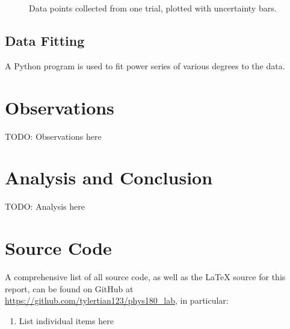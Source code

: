 \documentclass[aps,twocolumn,secnumarabic,nobalancelastpage,amsmath,amssymb,nofootinbib,floatfix]{revtex4}
\begin{document}
\begin{figure}[htb]
    \caption{Data points collected from one trial, plotted with uncertainty bars.}
    \label{fig:data1}
\end{figure}

\subsection{Data Fitting}

A Python program is used to fit power series of various degrees to the data.


\section{Observations}

TODO: Observations here


\section{Analysis and Conclusion}

TODO: Analysis here


\appendix

\section{Source Code}

A comprehensive list of all source code, as well as the \LaTeX{} source for this report, can be found on GitHub at
\url{https://github.com/tylertian123/phys180_lab}, in particular:
\label{appendix:code}
\begin{enumerate}
    \item List individual items here
\end{enumerate}
\end{document}
